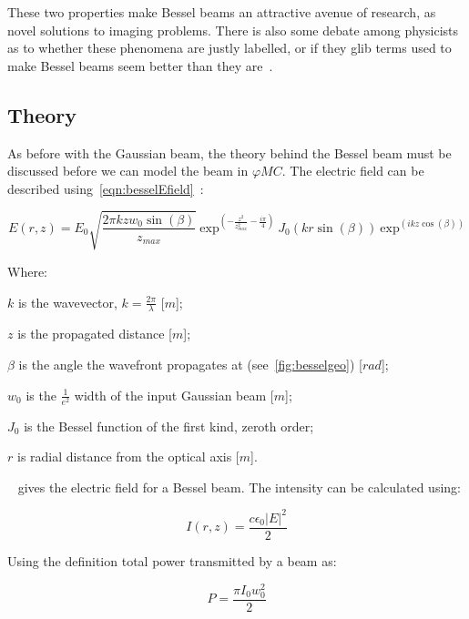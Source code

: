 These two properties make Bessel beams an attractive avenue of research, as novel solutions to imaging problems.
There is also some debate among physicists as to whether these phenomena are justly labelled, or if they glib terms used to make Bessel beams seem better than they are~\cite{debeer1987comment,harvey1984spot,durnin1987reply,sprangle1991comment,durnin1991durnin}.

\subsection{Theory}
As before with the Gaussian beam, the theory behind the Bessel beam must be discussed before we can model the beam in $\varphi MC$.
The electric field can be described using~\cref{eqn:besselEfield}~\cite{vcivzmar2006opticke}:

\begin{equation}
    E(r,z)=E_0\sqrt{\frac{2\pi k z w_0\sin(\beta)}{z_{max}}}\ \text{exp}^{\left(-\frac{z^2}{z_{max}^2}-\frac{i\pi}{4}\right)}\ J_0\left(kr\sin(\beta)\right)\ \text{exp}^{\left(ikz\cos(\beta)\right)}
    \label{eqn:besselEfield}
\end{equation}

\noindent Where:

    \indent $k$ is the wavevector, $k=\tfrac{2\pi}{\lambda}$ [$m$];

    \indent $z$ is the propagated distance [$m$]; 

    \indent $\beta$ is the angle the wavefront propagates at (see~\cref{fig:besselgeo}) [$rad$]; 

    \indent $w_0$ is the $\tfrac{1}{e^2}$ width of the input Gaussian beam [$m$]; 

    \indent $J_0$ is the Bessel function of the first kind, zeroth order; 

    \indent $r$ is radial distance from the optical axis [$m$]. 

\medskip


~ gives the electric field for a Bessel beam. The intensity can be calculated using:

\begin{equation}
    I(r,z)=\frac{c\epsilon_0\left|E\right|^2}{2}
    \label{eqn:besselintsub}
\end{equation}

Using the definition total power transmitted by a beam as:

\begin{equation}
    P=\frac{\pi I_0w_0^2}{2}
    \label{eqn:pwrdef}
\end{equation}

